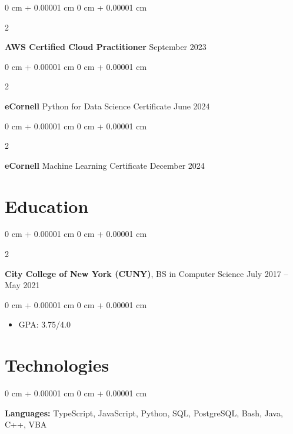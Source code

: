 \documentclass[10pt, letterpaper]{article}
\newenvironment{highlights}{
    \begin{itemize}[
        topsep=0.10 cm,
        parsep=0.10 cm,
        partopsep=0pt,
        itemsep=0pt,
        leftmargin=0 cm + 10pt
    ]
}{
    \end{itemize}
} %
\newenvironment{onecolentry}{
    \begin{adjustwidth}{
        0 cm + 0.00001 cm
    }{
        0 cm + 0.00001 cm
    }
}{
    \end{adjustwidth}
} %
\newenvironment{twocolentry}[2][]{
    \onecolentry
    \def\secondColumn{#2}
    \setcolumnwidth{\fill, 4.5 cm}
    \begin{paracol}{2}
}{
    \switchcolumn \raggedleft \secondColumn
    \end{paracol}
    \endonecolentry
} %
\begin{document}
        
        \begin{twocolentry}{
            September 2023
        }
            \textbf{AWS Certified Cloud Practitioner}\end{twocolentry}
        \vspace{0.10 cm}
        

        \begin{twocolentry}{
            June 2024
        }
            \textbf{eCornell} Python for Data Science Certificate\end{twocolentry}
        \vspace{0.10 cm}
        

        \begin{twocolentry}{
            December 2024
        }
            \textbf{eCornell} Machine Learning Certificate\end{twocolentry}

        \vspace{0.10 cm}

    \vspace{.3 cm}
    
    \section{Education}

        
        \begin{twocolentry}{
            July 2017 -- May 2021
        }
            \textbf{City College of New York (CUNY)}, BS in Computer Science\end{twocolentry}

        \vspace{0.10 cm}
        \begin{onecolentry}
            \begin{highlights}
                \item GPA: 3.75/4.0
            \end{highlights}
        \end{onecolentry}


    \vspace{.3 cm}
    
    \section{Technologies}

    \begin{onecolentry}
        \textbf{Languages:} TypeScript, JavaScript, Python, SQL, PostgreSQL, Bash, Java, C++, VBA
    \end{onecolentry}
\end{document}
